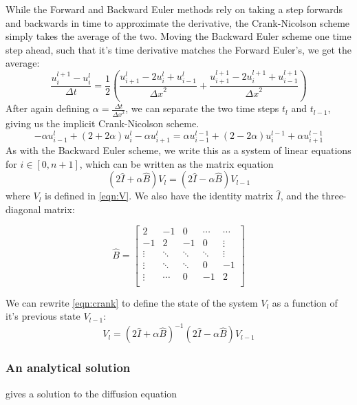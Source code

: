 \documentclass[10pt,a4paper]{article}
\newcommand{\dt}{{\Delta t}}
\newcommand{\dx}{{\Delta x}}
\begin{document}
While the Forward and Backward Euler methods rely on taking a step forwards and backwards in time to approximate the derivative, the Crank-Nicolson scheme simply takes the average of the two. Moving the Backward Euler scheme one time step ahead, such that it's time derivative matches the Forward Euler's, we get the average:
\begin{equation}
\frac{u_i^{l+1}-u_i^l}{\dt} = \frac{1}{2}\left( \frac{u_{i+1}^l - 2u_i^l + u_{i-1}^l}{\dx^2} + \frac{u_{i+1}^{l+1} - 2u_i^{l+1} + u_{i-1}^{l+1}}{\dx^2}\right)
\end{equation}
After again defining $\alpha = \frac{\dt}{\dx^2}$, we can separate the two time steps $t_l$ and $t_{l-1}$, giving us the implicit Crank-Nicolson scheme.
\begin{equation}
-\alpha u_{i-1}^l + (2+2\alpha)u_i^l - \alpha u_{i+1}^l = \alpha u_{i-1}^{l-1} + (2-2\alpha)u_i^{l-1} + \alpha u_{i+1}^{l-1}
\end{equation}
As with the Backward Euler scheme, we write this as a system of linear equations for $i \in [0,n+1]$, which can be written as the matrix equation
\begin{equation}\label{eqn:crank}
(2\hat{I}+\alpha \hat{B})V_l = (2\hat{I}-\alpha \hat{B})V_{l-1}
\end{equation}
where $V_l$ is defined in \vref{eqn:V}. We also have the identity matrix $\hat{I}$, and the three-diagonal matrix:

\[
\hat{B} = \begin{bmatrix}
2 & -1 & 0 & \cdots & \cdots \\
-1 & 2 & -1 & 0 & \vdots \\
\vdots & \ddots & \ddots & \ddots & \vdots \\
\vdots & \ddots & \ddots & 0 & -1 \\
\vdots & \cdots & 0 & -1 & 2 \\
\end{bmatrix}
\]

We can rewrite \vref{eqn:crank} to define the state of the system $V_l$ as a function of it's previous state $V_{l-1}$:
\begin{equation}
V_l = (2\hat{I}+\alpha \hat{B})^{-1} (2\hat{I} - \alpha \hat{B})V_{l-1}
\end{equation}

\subsubsection{An analytical solution}\label{sec:analytical_1d}
\cite{inf-mat2351_book} gives a solution to the diffusion equation
\end{document}
